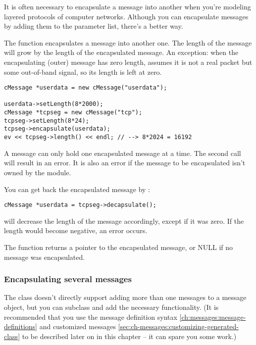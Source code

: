 It is often necessary to encapsulate a
message into another when you're modeling
layered protocols of computer networks. Although you can encapsulate
messages by adding them to the parameter list, there's a better way.


The  function encapsulates a message
into another one. The length of the message will grow by the length of
the encapsulated message. An exception: when the encapsulating (outer)
message has zero length, {\opp} assumes it is not a real packet but
some out-of-band signal, so its length is left at zero.

\begin{verbatim}
cMessage *userdata = new cMessage("userdata");

userdata->setLength(8*2000);
cMessage *tcpseg = new cMessage("tcp");
tcpseg->setLength(8*24);
tcpseg->encapsulate(userdata);
ev << tcpseg->length() << endl; // --> 8*2024 = 16192
\end{verbatim}

A message can only hold one encapsulated message at a time. The
second  call will result in an error. It is also
an error if the message to be encapsulated isn't owned by the
module.

You can get back the encapsulated message by :

\begin{verbatim}
cMessage *userdata = tcpseg->decapsulate();
\end{verbatim}

 will decrease the length of the message accordingly,
except if it was zero. If the length would become negative, an
error occurs.

The  function returns a pointer to the encapsulated
message, or NULL if no message was encapsulated.


\subsubsection{Encapsulating several messages}

The  class doesn't directly support adding more than one
messages to a message object, but you can subclass 
and add the necessary functionality. (It is recommended that you
use the message definition syntax \ref{ch:messages:message-definitions}
and customized messages \ref{sec:ch-messages:customizing-generated-class}
to be described later on in this chapter -- it can spare you some work.)

